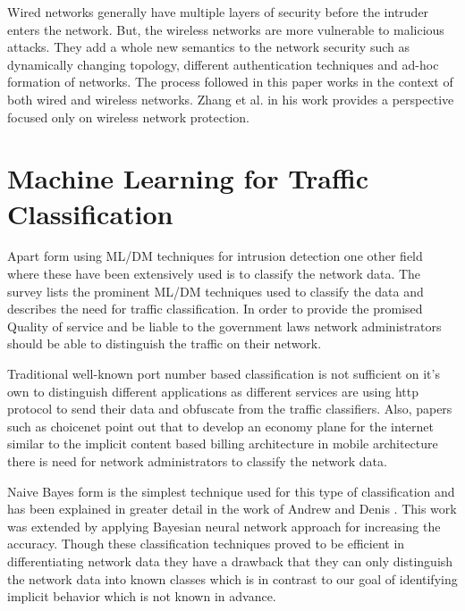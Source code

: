 Wired networks generally have multiple layers of security before the intruder enters the network. But, the wireless networks are more vulnerable to malicious attacks. They add a whole new semantics to the network security such as dynamically changing topology, different authentication techniques and ad-hoc formation of networks. The process  followed in this paper works in the context of both wired and wireless networks. Zhang et al. in his work \cite{zhang2003intrusion} provides a perspective focused only on wireless network protection.

\section{Machine Learning for Traffic Classification}

Apart form using ML/DM techniques for intrusion detection one other field where these have been extensively used is to classify the network data. The survey \cite{nguyen2008survey} lists the prominent ML/DM techniques used to classify the data and describes the need for traffic classification. In order to provide the promised Quality of service and be liable to the government laws network administrators should be able to distinguish the traffic on their network. 

Traditional well-known port number based classification is not sufficient on it's own to distinguish different applications  as different services are using http protocol to send their data and obfuscate from the traffic classifiers. Also, papers such as choicenet \cite{wolf2014choicenet} point out that to develop an economy plane for the internet similar to the implicit content based billing architecture in mobile architecture there is need for network administrators to classify the network data.

Naive Bayes form is the simplest technique used for this type of classification and has been explained in greater detail in the work of Andrew and Denis \cite{moore2005internet}. This work was extended by applying Bayesian neural network approach \cite{auld2007bayesian} for increasing the accuracy. Though these classification techniques proved to be efficient in differentiating network data they have a drawback that they can only distinguish the network data into known classes which is in contrast to our goal of identifying implicit behavior which is not known in advance.

